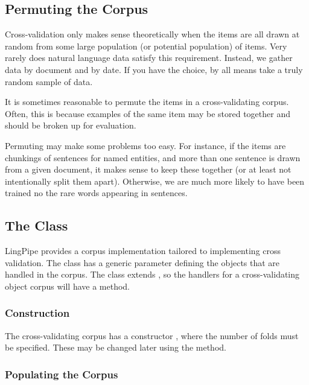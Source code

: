 \subsection{Permuting the Corpus}

Cross-validation only makes sense theoretically when the items are all
drawn at random from some large population (or potential population)
of items.  Very rarely does natural language data satisfy this
requirement.  Instead, we gather data by document and by date.  If you
have the choice, by all means take a truly random sample of data.

It is sometimes reasonable to permute the items in a cross-validating
corpus.  Often, this is because examples of the same item may be
stored together and should be broken up for evaluation.  

Permuting may make some problems too easy.  For instance, if the items
are chunkings of sentences for named entities, and more than one
sentence is drawn from a given document, it makes sense to keep these
together (or at least not intentionally split them apart).  Otherwise,
we are much more likely to have been trained no the rare words
appearing in sentences.

\subsection{The  Class}

LingPipe provides a corpus implementation tailored to implementing
cross validation.  The class  has
a generic parameter  defining the objects that are handled in
the corpus.  The class extends , so the
handlers for a cross-validating object corpus will have a
 method.

\subsubsection{Construction}

The cross-validating corpus has a constructor
, where the number of folds
must be specified.  These may be changed later using the
 method.

\subsubsection{Populating the Corpus}

